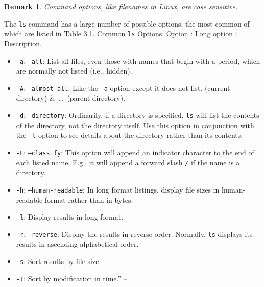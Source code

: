 \documentclass[oneside]{book}
\numberwithin{equation}{section}
\newtheorem{remark}{Remark}[chapter]
\begin{document}
\begin{remark}
	Command options, like filenames in Linux, are case sensitive.
\end{remark}
The \texttt{ls} command has a large number of possible options, the most common of which are listed in \textsf{Table 3.1. Common \texttt{ls} Options. Option : Long option : Description.}
\begin{itemize}
	\item \texttt{-a}: \texttt{--all}: List all files, even those with names that begin with a period, which are normally not listed (i.e., hidden).
	\item \texttt{-A}: \texttt{--almost-all}: Like the \texttt{-a} option except it does not list. (current directory) \& \texttt{..} (parent directory).
	\item \texttt{-d}: \texttt{--directory}: Ordinarily, if a directory is specified, \texttt{ls} will list the contents of the directory, not the directory itself. Use this option in conjunction with the \texttt{-l} option to see details about the directory rather than its contents.
	\item \texttt{-F}: \texttt{--classify}: This option will append an indicator character to the end of each listed name. E.g., it will append a forward slash \texttt{/} if the name is a directory.
	\item \texttt{-h}: \texttt{--human-readable}: In long format listings, display file sizes in human-readable format rather than in bytes.
	\item \texttt{-l}: Display results in long format.
	\item \texttt{-r}: \texttt{--reverse}: Display the results in reverse order. Normally, \texttt{ls} displays its results in ascending alphabetical order.
	\item \texttt{-s}: Sort results by file size.
	\item \texttt{-t}: Sort by modification in time.'' -- \cite[pp. 51--53]{Shotts2019}
\end{itemize}
\end{document}
